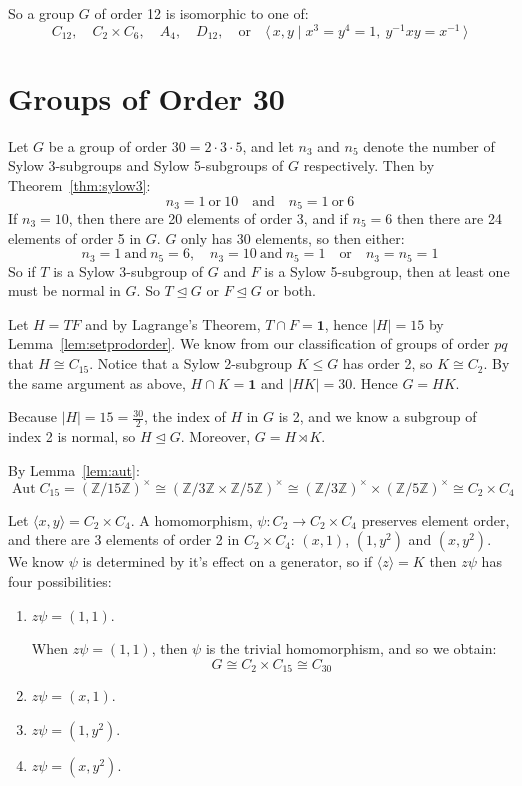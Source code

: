 \documentclass[a4paper, oneside, 12pt, final]{article}
\theoremstyle{definition}
\DeclareMathOperator{\Aut}{Aut}
\newcommand{\nrmsgp}{\unlhd}
\newcommand{\Z}{\mathbb{Z}}
\newcommand{\Zn}[1]{\Z/#1\Z}
\newcommand{\units}[1]{(\Zn{#1})^\times}
\begin{document}
So a group \(G\) of order 12 is isomorphic to one of:
\[
    C_{12}, \quad%
    C_2 \times C_6, \quad%
    A_4, \quad%
    D_{12}, \quad \text{or} \quad%
    \langle\, x, y \mid x^3 = y^4 = 1,\ y^{-1}xy = x^{-1}\,\rangle
\]




\section{Groups of Order 30}
Let \(G\) be a group of order \(30 = 2 \cdot 3 \cdot 5\), and let \(n_3\) and \(n_5\) denote the number of Sylow
3-subgroups and Sylow 5-subgroups of \(G\) respectively.
Then by Theorem~\ref{thm:sylow3}:
\[n_3 = 1 \ \text{or} \ 10 \quad \text{and} \quad n_5 = 1 \ \text{or} \ 6\]
If \(n_3 = 10\), then there are 20 elements of order 3, and if \(n_5 = 6\) then
there are 24 elements of order 5 in \(G\).
\(G\) only has 30 elements, so then either:
\[n_3 = 1 \ \text{and} \ n_5 = 6, \quad n_3 = 10 \ \text{and} \ n_5 = 1 \quad \text{or} \quad n_3 = n_5 = 1\]
So if \(T\) is a Sylow 3-subgroup of \(G\) and \(F\) is a Sylow 5-subgroup, then at least one must be normal in \(G\).
So \(T \nrmsgp G\) or \(F \nrmsgp G\) or both.

Let \(H = TF\) and by Lagrange's Theorem, \(T \cap F = \bm{1}\), hence \(|H| = 15\) by Lemma~\ref{lem:setprodorder}.
We know from our classification of groups of order \(pq\) that \(H \cong C_{15}\).
Notice that a Sylow 2-subgroup \(K \leqslant G\) has order 2, so \(K \cong C_2\).
By the same argument as above, \(H \cap K = \bm{1}\) and \(|HK| = 30\).
Hence \(G = HK\).

Because \(|H| = 15 = \frac{30}{2}\), the index of \(H\) in \(G\) is 2, and we know a subgroup of index 2 is normal, so
\(H \nrmsgp G\).
Moreover, \(G = H \rtimes K\).

By Lemma~\ref{lem:aut}:
\[\Aut{C_{15}} = \units{15} \cong {(\Zn{3} \times \Zn{5})}^\times \cong \units{3} \times \units{5} \cong C_2 \times C_4\]

Let \(\langle x, y \rangle = C_2 \times C_4\).
A homomorphism, \(\psi:C_2 \to C_2 \times C_4\) preserves element order, and there are 3 elements of order 2 in \(C_2
\times C_4\): \((x, 1)\), \((1, y^2)\) and \((x, y^2)\).
We know \(\psi\) is determined by it's effect on a generator, so if \(\langle z \rangle = K\) then \(z\psi\) has four
possibilities:

\begin{enumerate}
    \item \(z\psi = (1, 1)\).

        When \(z\psi = (1, 1)\), then \(\psi\) is the trivial homomorphism, and
        so we obtain:
        \[G \cong C_2 \times C_{15} \cong C_{30}\]

    \item \(z\psi = (x, 1)\).
    \item \(z\psi = (1, y^2)\).
    \item \(z\psi = (x, y^2)\).
\end{enumerate}
\end{document}
